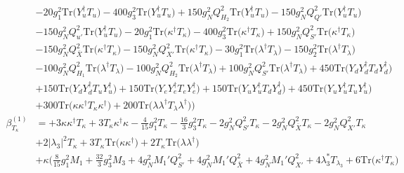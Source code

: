 {\begin{align}
 &-20 g_{1}^{2} \mbox{Tr}\Big({Y_{u}^{\dagger}  T_u}\Big) -400 g_{3}^{2} \mbox{Tr}\Big({Y_{u}^{\dagger}  T_u}\Big) +150 g_{N}^{2} Q_{H_2}^{2} \mbox{Tr}\Big({Y_{u}^{\dagger}  T_u}\Big) -150 g_{N}^{2} Q_{Q'}^{2} \mbox{Tr}\Big({Y_{u}^{\dagger}  T_u}\Big) \nonumber \\ 
 &-150 g_{N}^{2} Q_{u'}^{2} \mbox{Tr}\Big({Y_{u}^{\dagger}  T_u}\Big) -20 g_{1}^{2} \mbox{Tr}\Big({\kappa^{\dagger}  T_{\kappa}}\Big) -400 g_{3}^{2} \mbox{Tr}\Big({\kappa^{\dagger}  T_{\kappa}}\Big) +150 g_{N}^{2} Q_{S'}^{2} \mbox{Tr}\Big({\kappa^{\dagger}  T_{\kappa}}\Big) \nonumber \\ 
 &-150 g_{N}^{2} Q_{\bar{X}}^{2} \mbox{Tr}\Big({\kappa^{\dagger}  T_{\kappa}}\Big) -150 g_{N}^{2} Q_{X'}^{2} \mbox{Tr}\Big({\kappa^{\dagger}  T_{\kappa}}\Big) -30 g_{1}^{2} \mbox{Tr}\Big({\lambda^{\dagger}  T_{\lambda}}\Big) -150 g_{2}^{2} \mbox{Tr}\Big({\lambda^{\dagger}  T_{\lambda}}\Big) \nonumber \\ 
 &-100 g_{N}^{2} Q_{H_1}^{2} \mbox{Tr}\Big({\lambda^{\dagger}  T_{\lambda}}\Big) -100 g_{N}^{2} Q_{H_2}^{2} \mbox{Tr}\Big({\lambda^{\dagger}  T_{\lambda}}\Big) +100 g_{N}^{2} Q_{S'}^{2} \mbox{Tr}\Big({\lambda^{\dagger}  T_{\lambda}}\Big) +450 \mbox{Tr}\Big({Y_d  Y_{d}^{\dagger}  T_d  Y_{d}^{\dagger}}\Big) \nonumber \\ 
 &+150 \mbox{Tr}\Big({Y_d  Y_{d}^{\dagger}  T_u  Y_{u}^{\dagger}}\Big) +150 \mbox{Tr}\Big({Y_e  Y_{e}^{\dagger}  T_e  Y_{e}^{\dagger}}\Big) +150 \mbox{Tr}\Big({Y_u  Y_{u}^{\dagger}  T_d  Y_{d}^{\dagger}}\Big) +450 \mbox{Tr}\Big({Y_u  Y_{u}^{\dagger}  T_u  Y_{u}^{\dagger}}\Big) \nonumber \\ 
 &+300 \mbox{Tr}\Big({\kappa  \kappa^{\dagger}  T_{\kappa}  \kappa^{\dagger}}\Big) +200 \mbox{Tr}\Big({\lambda  \lambda^{\dagger}  T_{\lambda}  \lambda^{\dagger}}\Big) \Big)\\ 
\beta_{T_{\kappa}}^{(1)} & =  
+3 {\kappa  \kappa^{\dagger}  T_{\kappa}} +3 {T_{\kappa}  \kappa^{\dagger}  \kappa} -\frac{4}{15} g_{1}^{2} T_{\kappa} -\frac{16}{3} g_{3}^{2} T_{\kappa} -2 g_{N}^{2} Q_{S'}^{2} T_{\kappa} -2 g_{N}^{2} Q_{\bar{X}}^{2} T_{\kappa} -2 g_{N}^{2} Q_{X'}^{2} T_{\kappa} \nonumber \\ 
 &+2 |\lambda_3|^2 T_{\kappa} +3 T_{\kappa} \mbox{Tr}\Big({\kappa  \kappa^{\dagger}}\Big) +2 T_{\kappa} \mbox{Tr}\Big({\lambda  \lambda^{\dagger}}\Big) \nonumber \\ 
 &+\kappa \Big(\frac{8}{15} g_{1}^{2} M_1 +\frac{32}{3} g_{3}^{2} M_3 +4 g_{N}^{2} M_1' Q_{S'}^{2} +4 g_{N}^{2} M_1' Q_{\bar{X}}^{2} +4 g_{N}^{2} M_1' Q_{X'}^{2} +4 \lambda_3^* T_{\lambda_3} +6 \mbox{Tr}\Big({\kappa^{\dagger}  T_{\kappa}}\Big) \nonumber \\ 

\end{align}}
